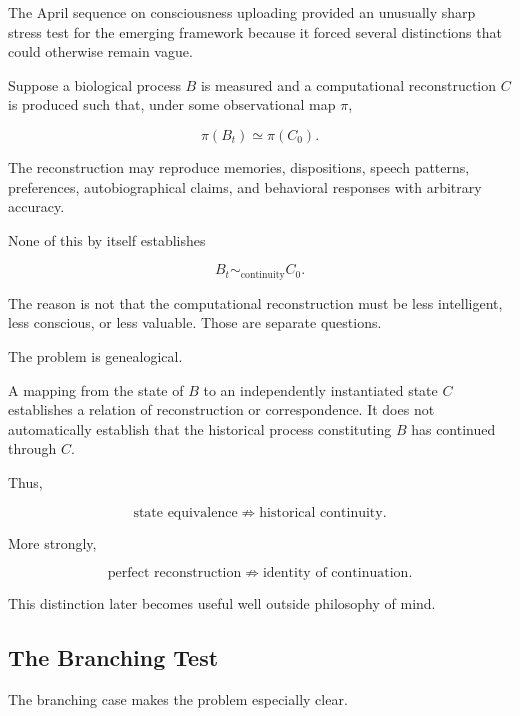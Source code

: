 \documentclass[11pt]{article}
\theoremstyle{remark}
\begin{document}
The April sequence on consciousness uploading provided an unusually sharp stress test for the emerging framework because it forced several distinctions that could otherwise remain vague.

Suppose a biological process $B$ is measured and a computational reconstruction $C$ is produced such that, under some observational map $\pi$,

\begin{equation}
\pi(B_t)
\simeq
\pi(C_0).
\end{equation}

The reconstruction may reproduce memories, dispositions, speech patterns, preferences, autobiographical claims, and behavioral responses with arbitrary accuracy.

None of this by itself establishes

\begin{equation}
B_t
\sim_{\mathrm{continuity}}
C_0.
\end{equation}

The reason is not that the computational reconstruction must be less intelligent, less conscious, or less valuable. Those are separate questions.

The problem is genealogical.

A mapping from the state of $B$ to an independently instantiated state $C$ establishes a relation of reconstruction or correspondence. It does not automatically establish that the historical process constituting $B$ has continued through $C$.

Thus,

\begin{equation}
\text{state equivalence}
\not\Rightarrow
\text{historical continuity}.
\end{equation}

More strongly,

\begin{equation}
\text{perfect reconstruction}
\not\Rightarrow
\text{identity of continuation}.
\end{equation}

This distinction later becomes useful well outside philosophy of mind.

\subsection{The Branching Test}

The branching case makes the problem especially clear.
\end{document}
